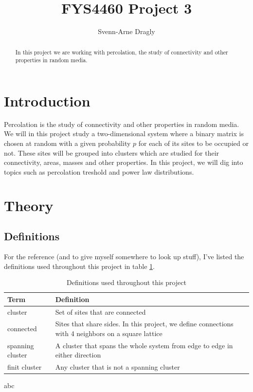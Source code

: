 \documentclass[a4paper,reprint,floatfix,amsmath,amssymb,aps,pra]{revtex4-1}
\begin{document}
\title{FYS4460 Project 3}
\author{Svenn-Arne Dragly}

\begin{abstract}
In this project we are working with percolation, the study of connectivity and other properties in random media.
\end{abstract}

\maketitle

\section{Introduction}

Percolation is the study of connectivity and other properties in random media. We will in this project study a two-dimensional system where a binary matrix is chosen at random with a given probability $p$ for each of its sites to be occupied or not. These sites will be grouped into clusters which are studied for their connectivity, areas, masses and other properties. In this project, we will dig into topics such as percolation treshold and power law distributions.

\section{Theory}

\subsection{Definitions}

For the reference (and to give myself somewhere to look up stuff), I've listed the definitions used throughout this project in table \ref{tab:definitions}.
\begingroup
\begin{table}[ht]
\begin{ruledtabular}
\begin{tabular}{l p{}}
Term       &                  Definition \\
\hline
cluster & Set of sites that are connected \\
connected & Sites that share sides. In this project, we define connections with 4 neighbors on a square lattice \\
spanning cluster & A cluster that spans the whole system from edge to edge in either direction \\
finit cluster & Any cluster that is not a spanning cluster \\
\end{tabular}
\end{ruledtabular}
\caption{Definitions used throughout this project}
\label{tab:definitions}
\end{table}
\endgroup
\begin{table}
abc
\end{table}
\end{document}
